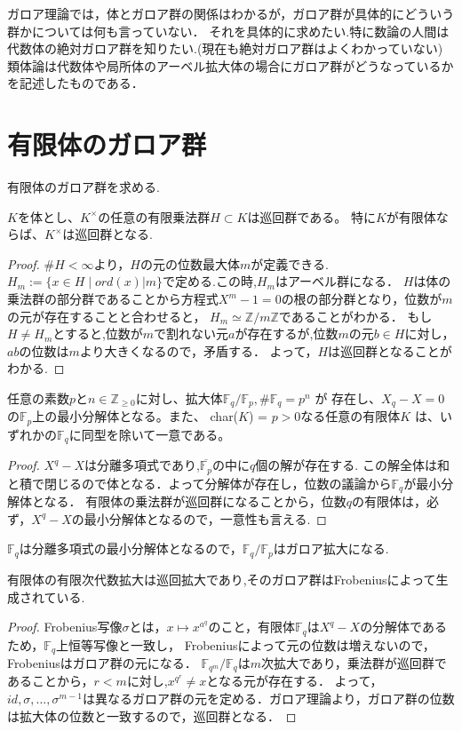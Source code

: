 \documentclass{ujarticle}
\begin{document}
ガロア理論では，体とガロア群の関係はわかるが，ガロア群が具体的にどういう群かについては何も言っていない．
それを具体的に求めたい.特に数論の人間は代数体の絶対ガロア群を知りたい.(現在も絶対ガロア群はよくわかっていない)
類体論は代数体や局所体のアーベル拡大体の場合にガロア群がどうなっているかを記述したものである．

\section{有限体のガロア群}
\label{sec:有限体のガロア群}

有限体のガロア群を求める.

\begin{prop}
  $K$を体とし、$K^{\times}$の任意の有限乗法群$H \subset  K$は巡回群である。
  特に$K$が有限体ならば、$K^{\times}$は巡回群となる.
\end{prop}
\begin{proof}
  $\# H < \infty$より，$H$の元の位数最大体$m$が定義できる.
  $H_m:= \{ x \in H \mid ord(x) | m\} $で定める.この時,$H_m$はアーベル群になる．
  $H$は体の乗法群の部分群であることから方程式$X^m -1 =0$の根の部分群となり，位数が$m$の元が存在することと合わせると，
  $H_m \simeq \mathbb{Z}/m \mathbb{Z}$であることがわかる．
  もし$H \neq H_m$とすると,位数が$m$で割れない元$a$が存在するが,位数$m$の元$b \in H$に対し，$ab$の位数は$m$より大きくなるので，矛盾する．
  よって，$H$は巡回群となることがわかる.
\end{proof}
\begin{prop}
任意の素数$p$と$n\in  \mathbb{Z}_{\ge 0}$に対し、拡大体$\mathbb{F}_q/\mathbb{F}_p, \#\mathbb{F}_q  =p^n$ が
存在し、$X_q − X = 0$ の$\mathbb{F}_p$上の最小分解体となる。また、
char($K$) = $p > 0$なる任意の有限体$K$ は、いずれかの$\mathbb{F}_q$に同型を除いて一意である。
\end{prop}
\begin{proof}
$X^q -X$は分離多項式であり,$\overline{\mathbb{F}_p}$の中に$q$個の解が存在する.
この解全体は和と積で閉じるので体となる．よって分解体が存在し，位数の議論から$\mathbb{F}_q$が最小分解体となる．
有限体の乗法群が巡回群になることから，位数$q$の有限体は，必ず，$X^q - X$の最小分解体となるので，一意性も言える.
\end{proof}

$\mathbb{F}_q$は分離多項式の最小分解体となるので，$\mathbb{F}_q/\mathbb{F}_p$はガロア拡大になる.
\begin{thm}
有限体の有限次代数拡大は巡回拡大であり,そのガロア群はFrobeniusによって生成されている.
\end{thm}
\begin{proof}
  Frobenius写像$\sigma$とは，$x \mapsto x^{a^q}$のこと，有限体$\mathbb{F}_q$は$X^q -X$の分解体であるため，$\mathbb{F}_q$上恒等写像と一致し，
  Frobeniusによって元の位数は増えないので，Frobeniusはガロア群の元になる．
  $\mathbb{F}_{q^m}/\mathbb{F}_q$は$m$次拡大であり，乗法群が巡回群であることから，$r < m$に対し,$x^{q^r} \neq x$となる元が存在する．
  よって，$id,\sigma,\dots,\sigma^{m-1}$は異なるガロア群の元を定める．ガロア理論より，ガロア群の位数は拡大体の位数と一致するので，巡回群となる．
\end{proof}
\end{document}

